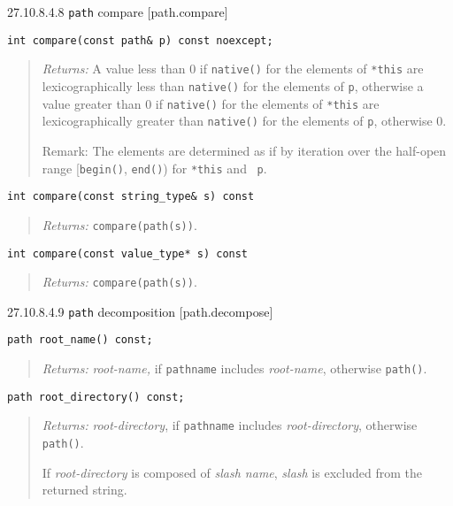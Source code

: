 27.10.8.4.8 \texttt{path} compare {[}path.compare{]}

\begin{verbatim}
int compare(const path& p) const noexcept;
\end{verbatim}

\begin{quote}
\emph{Returns:} A value less than 0 if \texttt{native()} for the
elements of \texttt{*this} are lexicographically less than
\texttt{native()} for the elements of \texttt{p}, otherwise a value
greater than 0 if \texttt{native()} for the elements of \texttt{*this}
are lexicographically greater than \texttt{native()} for the elements of
\texttt{p}, otherwise 0.

Remark: The elements are determined as if by iteration over the
half-open range {[}\texttt{begin()}, \texttt{end()}) for \texttt{*this}
and~ \texttt{p}.
\end{quote}

\begin{verbatim}
int compare(const string_type& s) const
\end{verbatim}

\begin{quote}
\emph{Returns:} \texttt{compare(path(s))}.
\end{quote}

\begin{verbatim}
int compare(const value_type* s) const
\end{verbatim}

\begin{quote}
\emph{Returns:} \texttt{compare(path(s))}.
\end{quote}

27.10.8.4.9 \texttt{path} decomposition {[}path.decompose{]}

\begin{verbatim}
path root_name() const;
\end{verbatim}

\begin{quote}
\emph{Returns:} \emph{root-name,} if \texttt{pathname} includes
\emph{root-name}, otherwise \texttt{path()}.
\end{quote}

\begin{verbatim}
path root_directory() const;
\end{verbatim}

\begin{quote}
\emph{Returns:} \emph{root-directory}, if \texttt{pathname} includes
\emph{root-directory}, otherwise \texttt{path()}.

If \emph{root-directory} is composed of \emph{slash name}, \emph{slash}
is excluded from the returned string.
\end{quote}

